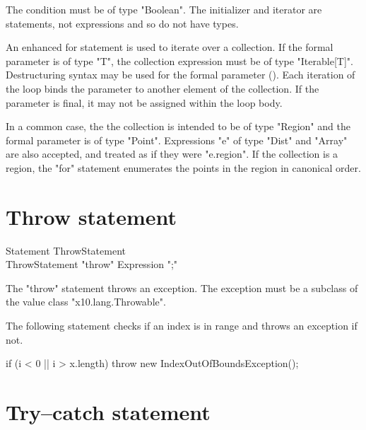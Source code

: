 The condition must be of type \xcd"Boolean".
The initializer and iterator are statements, not expressions
and so do not have types.

\label{ForAllLoop}


An enhanced for statement is used to iterate over a collection.
If the formal parameter is of type \xcd"T",
the collection expression must be of type \xcd"Iterable[T]".
Destructuring
syntax may
be used for the formal parameter ().
Each iteration of the loop
binds the parameter to another element of the collection.
If the parameter is final, it may not be assigned within the
loop body.

In a common case, the
the collection is intended to be of type
\xcd"Region" and the formal parameter is of type \xcd"Point".
Expressions \xcd"e" of type \xcd"Dist" and
\xcd"Array" are also accepted, and treated as if they were
\xcd"e.region".
If the collection is a region, the \xcd"for" statement
enumerates the points in the region in canonical order.



\section{Throw statement}

\begin{grammar}
Statement \: ThrowStatement \\
ThrowStatement \: \xcd"throw" Expression \xcd";"
\end{grammar}

The \xcd"throw" statement throws an exception.  The exception
must be a subclass of the value class \xcd"x10.lang.Throwable". 

\begin{example}
The following statement checks if an index is in range and
throws an exception if not.
\begin{xten}
if (i < 0 || i > x.length)
    throw new IndexOutOfBoundsException();
\end{xten}
\end{example}

\section{Try--catch statement}

